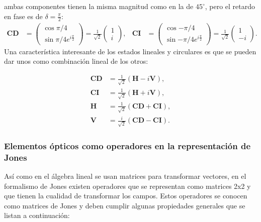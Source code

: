 ambas componentes tienen la misma magnitud como en la de $45^{\circ}$,
pero el retardo en fase es de $\delta = \frac{\pi}{2}$:
\begin{align*}
\mathbf{CD}
&=\begin{pmatrix}\cos{\pi/4}\\\sin{\pi/4}e^{i\frac{\pi}{2}}\end{pmatrix}=\frac{1}{\sqrt{2}}
\begin{pmatrix}1\\i\end{pmatrix},&
\mathbf{CI} 
&=\begin{pmatrix}\cos{-\pi/4}\\\sin{-\pi/4}e^{i\frac{\pi}{2}}\end{pmatrix}=\frac{1}{\sqrt{2}}\begin{pmatrix}1\\-i\end{pmatrix}. 
\end{align*} 
Una característica interesante de los estados lineales y circulares es
que se pueden dar unos como combinación lineal de los otros:

\begin{align*}
\mathbf{CD} &= \frac{1}{\sqrt{2}}\left( \mathbf{H} -
  i\mathbf{V}\right),\\
\mathbf{CI} &= \frac{1}{\sqrt{2}}\left( \mathbf{H} +
  i\mathbf{V}\right),\\
\mathbf{H} &= \frac{1}{\sqrt{2}}\left( \mathbf{CD} +
  \mathbf{CI}\right),\\
\mathbf{V} &= \frac{i}{\sqrt{2}}\left( \mathbf{CD} -
  \mathbf{CI}\right).
\end{align*}

\subsubsection{Elementos ópticos como operadores en la representación
  de Jones}

Así como en el álgebra lineal se usan matrices para transformar
vectores, en el formalismo de Jones existen operadores que se
representan como matrices 2x2 y que tienen la cualidad de
transformar los campos. Estos operadores se conocen como matrices de
Jones y deben cumplir algunas
propiedades generales  que se listan a continuación:

